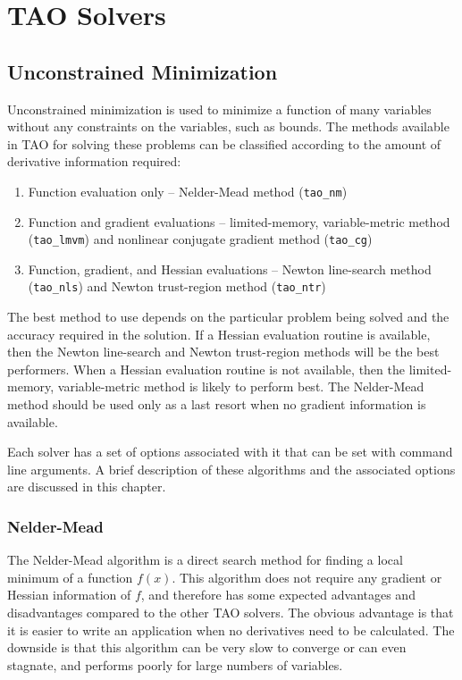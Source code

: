 
\chapter{TAO Solvers}

\section{Unconstrained Minimization}
\label{chapter:unconstrained}
Unconstrained minimization is used to minimize a function of many variables
without any constraints on the variables, such as bounds.  The methods 
available in TAO for solving these problems can be classified according
to the amount of derivative information required:
\begin{enumerate}
\item Function evaluation only -- Nelder-Mead method ({\tt tao\_nm})
\item Function and gradient evaluations -- limited-memory, variable-metric 
method ({\tt tao\_lmvm}) and nonlinear conjugate gradient method 
({\tt tao\_cg})
\item Function, gradient, and Hessian evaluations -- Newton line-search 
method ({\tt tao\_nls}) and Newton trust-region method ({\tt tao\_ntr})
\end{enumerate}
The best method to use depends on the particular problem being solved
and the accuracy required in the solution.  If a Hessian evaluation 
routine is available, then the Newton line-search and Newton trust-region 
methods will be the best performers.  When a Hessian evaluation routine
is not available, then the limited-memory, variable-metric method is 
likely to perform best.  The Nelder-Mead method should be used only
as a last resort when no gradient information is available.

Each solver has a set of options associated with it that can be set with 
command line arguments.  A brief description of these algorithms and the 
associated options are discussed in this chapter.

\subsection{Nelder-Mead}
The Nelder-Mead algorithm \cite{nelder.mead:simplex} is a direct search method for finding a local
minimum of a function $f(x)$.  This algorithm does not require any gradient or Hessian 
information of $f$, and therefore has some expected advantages and disadvantages compared
to the other TAO solvers.  The obvious advantage is that it is easier to write an 
application when no derivatives need to be calculated.  The downside is that this algorithm can
be very slow to converge or can even stagnate, and performs poorly for large numbers of variables.

